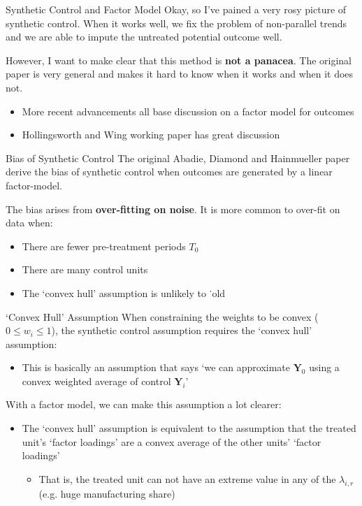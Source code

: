 \documentclass[t]{beamer}
\begin{document}
\begin{frame}{Synthetic Control and Factor Model}
  Okay, so I've pained a very rosy picture of synthetic control. When it works well, we fix the problem of non-parallel trends and we are able to impute the untreated potential outcome well.

  \bigskip
  However, I want to make clear that this method is \textbf{not a panacea}. The original paper is very general and makes it hard to know when it works and when it does not.
  \begin{itemize}
    \item More recent advancements all base discussion on a factor model for outcomes
    \item Hollingsworth and Wing working paper has great discussion
  \end{itemize}
\end{frame}

\begin{frame}{Bias of Synthetic Control}
  The original Abadie, Diamond and Hainmueller paper derive the bias of synthetic control when outcomes are generated by a linear factor-model.

  \bigskip
  The bias arises from \textbf{over-fitting on noise}. It is more common to over-fit on data when:
  \begin{itemize}
    \item There are fewer pre-treatment periods $T_0$

    \item There are many control units

    \item The `convex hull' assumption is unlikely to ˙old
  \end{itemize}
\end{frame}

\begin{frame}{`Convex Hull' Assumption}
  When constraining the weights to be convex ($0 \leq w_i \leq 1$), the synthetic control assumption requires the `convex hull' assumption:
  \begin{itemize}
    \item This is basically an assumption that says `we can approximate $\bm{Y}_{0}$ using a convex weighted average of control $\bm{Y}_i$'
  \end{itemize}

  \pause
  \bigskip
  With a factor model, we can make this assumption a lot clearer:
  \begin{itemize}
    \item The `convex hull' assumption is equivalent to the assumption that the treated unit's `factor loadings' are a convex average of the other units' `factor loadings'
    \begin{itemize}
      \item That is, the treated unit can not have an extreme value in any of the $\lambda_{i,r}$ (e.g. huge manufacturing share)
    \end{itemize}
  \end{itemize}
\end{frame}
\end{document}
